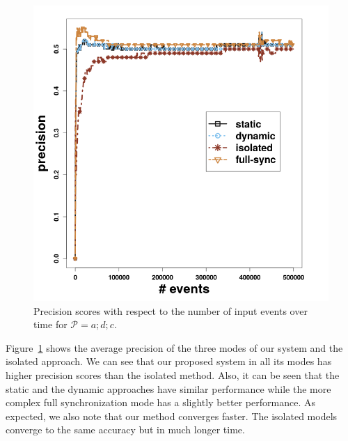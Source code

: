 \begin{figure}[H]
	\centering
	\includegraphics[width=\textwidth]{chapters/figures/synthetic/precision_synthetic_15_0001.png}
	
	\caption{Precision scores with respect to the number of input events over time for $\mathcal{P}=a;d;c$.}
	\label{fig:precsion_synthetic}
\end{figure}

\par Figure~\ref{fig:precsion_synthetic} shows the average precision of the three modes of our system and the isolated approach. We can see that our proposed system in all its modes has higher precision scores than the isolated method. Also, it can be seen that the static and the dynamic approaches have similar performance while the more complex full synchronization mode has a slightly better performance. As expected, we also note that our method converges faster. The isolated models converge to the same accuracy but in much longer time.

